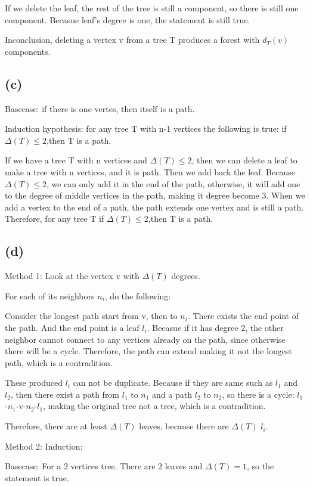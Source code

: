 \documentclass[11pt]{article}
\begin{document}
If we delete the leaf, the rest of the tree is still a component, so there is still one component. Becasue leaf's degree is one, the statement is still true.

Inconclusion, deleting a vertex v from a tree T produces a forest with $d_T (v)$components.

\subsection*{(c)}
Basecase: if there is one vertes, then itself is a path.

Induction hypothesis: for any tree T with n-1 vertices the following is true: if $\Delta(T ) \le 2$,then T is a path.

If we have a tree T with n vertices and $\Delta(T ) \le 2$, then we can delete a leaf to make a tree with n vertices, and it is path. Then we add back the leaf. Because $\Delta(T ) \le 2$, we can only add it in the end of the path, otherwise, it will add one to the degree of middle vertices in the path, making it degree become 3. When we add a vertex to the end of a path, the path extends one vertex and is still a path. Therefore, for any tree T if $\Delta(T ) \le 2$,then T is a path.

\subsection*{(d)}
Method 1:
Look at the vertex v with $\Delta(T)$ degrees. 

For each of its neighbors $n_i$, do the following:

Consider the longest path start from v, then to $n_i$. There exists the end point of the path. And the end point is a leaf $l_i$. Becasue if it has degree 2, the other neighbor cannot connect to any vertices already on the path, since otherwise there will be a cycle. Therefore, the path can extend making it not the longest path, which is a contradition.

These produced $l_i$ can not be duplicate. Because if they are same such as $l_1$ and $l_2$, then there exist a path from $l_1$ to $n_1$ and a path $l_2$ to $n_2$, so there is a cycle: $l_1$-$n_1$-v-$n_2$-$l_1$, making the original tree not a tree, which is a contradition.

Therefore, there are at least $\Delta(T)$ leaves, because there are $\Delta(T)$ $l_i$.


Method 2: Induction:

Basecase: For a 2 vertices tree. There are 2 leaves and $\Delta(T)=1$, so the statement is true.
\end{document}
